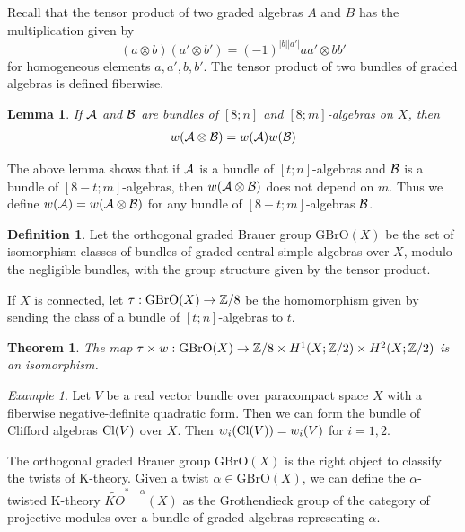 \documentclass{amsart}
\numberwithin{equation}{section}
\theoremstyle{plain} %
\newtheorem{theorem}[equation]{Theorem}
\newtheorem{lemma}[equation]{Lemma}
\theoremstyle{definition}
\newtheorem{definition}[equation]{Definition}
\theoremstyle{remark}
\newtheorem{example}[equation]{Example}
\begin{document}
Recall that the tensor product of two graded algebras $A$ and $B$ has the multiplication given by \[(a\otimes b)(a'\otimes b')=(-1)^{|b||a'|}aa'\otimes bb'\] for homogeneous elements $a,a',b,b'$. The tensor product of two bundles of graded algebras is defined fiberwise.
\begin{lemma}
    If ${\mathcal{A}}$ and ${\mathcal{B}}$ are bundles of $[8;n]$ and $[8;m]$-algebras on $X$, then \begin{align*}
    w({\mathcal{A}} \otimes {\mathcal{B}}) = w({\mathcal{A}})w({\mathcal{B}}) 
    \end{align*} 
\end{lemma}
The above lemma shows that if ${\mathcal{A}}$ is a bundle of $[t;n]$-algebras and ${\mathcal{B}}$ is a bundle of $[8-t;m]$-algebras, then $w({\mathcal{A}} \otimes {\mathcal{B}})$ does not depend on $m$. Thus we define $w({\mathcal{A}})=w({\mathcal{A}} \otimes {\mathcal{B}})$ for any bundle of $[8-t;m]$-algebras ${\mathcal{B}}$.

\begin{definition}
    Let the orthogonal graded Brauer group $\mathrm{GBrO}(X)$ be the set of isomorphism classes of bundles of graded central simple algebras over $X$, modulo the negligible bundles, with the group structure given by the tensor product. 
\end{definition}
If $X$ is connected, let $\tau: \mathrm{GBrO}(X) \to \mathbb{Z}/8$ be the homomorphism given by sending the class of a bundle of $[t;n]$-algebras to $t$. 

\begin{theorem}
    The map $\tau \times w: \mathrm{GBrO}(X) \to \mathbb{Z}/8 \times H^1(X;\mathbb Z/2) \times H^2(X;\mathbb Z/2)$ is an isomorphism.
\end{theorem}

\begin{example}
    Let $V$ be a real vector bundle over paracompact space $X$ with a fiberwise negative-definite quadratic form. Then we can form the bundle of Clifford algebras $\operatorname{Cl}(V)$ over $X$. Then $w_i(\operatorname{Cl}(V))=w_i(V)$ for $i=1,2$.
\end{example}

The orthogonal graded Brauer group $\mathrm{GBrO}(X)$ is the right object to classify the twists of K-theory. Given a twist $\alpha \in \mathrm{GBrO}(X)$, we can define the $\alpha$-twisted K-theory $\widetilde{KO}^{*-\alpha}(X)$ as the Grothendieck group of the category of projective modules over a bundle of graded algebras representing $\alpha$. 


{}

\end{document}

